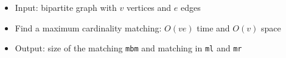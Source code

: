 \begin{itemize}
	\item Input: bipartite graph with $v$ vertices and $e$ edges
	\item Find a maximum cardinality matching: $O(ve)$ time and $O(v)$ space
	\item Output: size of the matching \lstinline{mbm} and matching in \lstinline{ml} and \lstinline{mr}
\end{itemize}
